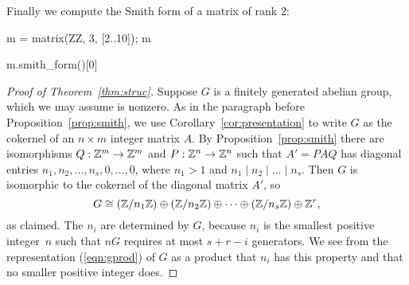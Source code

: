 \begin{example}
Finally we compute the Smith form of a matrix of rank $2$:
\begin{sagecode}
\begin{sagecell}
m = matrix(ZZ, 3, [2..10]); m
\end{sagecell}
\begin{sageout}
[ 2  3  4]
[ 5  6  7]
[ 8  9 10]
\end{sageout}
\begin{sagecell}
m.smith_form()[0]
\end{sagecell}
\begin{sageout}
[1 0 0]
[0 3 0]
[0 0 0]
\end{sageout}
\end{sagecode}
\end{example}


\begin{proof}[Proof of Theorem~\ref{thm:struc}] 
Suppose $G$ is a finitely generated abelian group, which we may assume
is nonzero.  As in the paragraph before Proposition~\ref{prop:smith},
we use Corollary~\ref{cor:presentation} to write $G$ as the cokernel
of an $n\times m$ integer matrix $A$.  By Proposition~\ref{prop:smith}
there are isomorphisms $Q:\mathbb{Z}^m\to \mathbb{Z}^m$ and $P:\mathbb{Z}^n\to \mathbb{Z}^n$ such that
$A'=PAQ$ has diagonal entries $n_1, n_2,\ldots,
n_s,0,\ldots,0$, where $n_1>1$ and $n_1\mid n_2 \mid{} \ldots \mid{}
n_s$.  Then $G$ is isomorphic to the cokernel of the diagonal matrix
$A'$, so
\begin{equation}
\label{eqn:gprod}
  G \cong (\mathbb{Z}/n_1\mathbb{Z}) \oplus (\mathbb{Z}/n_2\mathbb{Z})
 \oplus \cdots \oplus (\mathbb{Z}/n_s\mathbb{Z}) \oplus \mathbb{Z}^{r},
\end{equation}
as claimed.  The $n_i$ are determined by $G$, because $n_i$ is the
smallest positive integer~$n$ such that $nG$ requires at most $s+r-i$
generators. We see from the representation (\ref{eqn:gprod}) of $G$ as
a product that $n_i$ has this property and that no smaller positive
integer does.
\end{proof}

